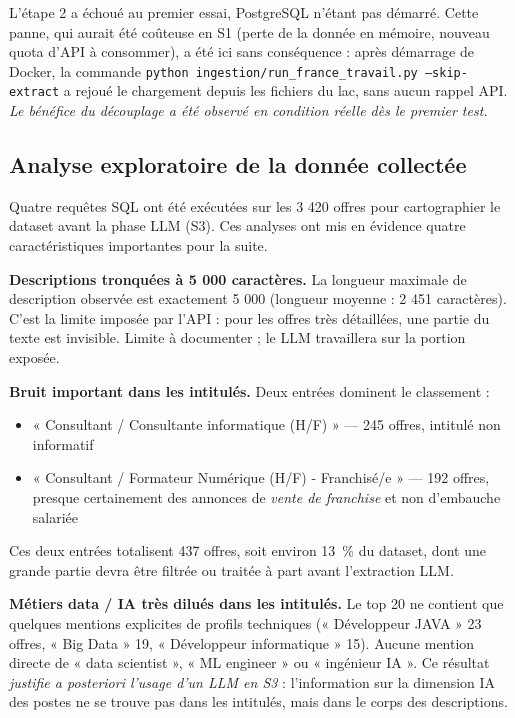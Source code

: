 \documentclass[12pt, a4paper]{article}
\begin{document}
L'étape 2 a échoué au premier essai, PostgreSQL n'étant pas démarré. Cette panne, qui aurait été coûteuse en S1 (perte de la donnée en mémoire, nouveau quota d'API à consommer), a été ici sans conséquence : après démarrage de Docker, la commande \texttt{python ingestion/run\_france\_travail.py --skip-extract} a rejoué le chargement depuis les fichiers du lac, sans aucun rappel API. \emph{Le bénéfice du découplage a été observé en condition réelle dès le premier test.}

\subsection{Analyse exploratoire de la donnée collectée}

Quatre requêtes SQL ont été exécutées sur les 3 420 offres pour cartographier le dataset avant la phase LLM (S3). Ces analyses ont mis en évidence quatre caractéristiques importantes pour la suite.

\textbf{Descriptions tronquées à 5 000 caractères.} La longueur maximale de description observée est exactement 5 000 (longueur moyenne : 2 451 caractères). C'est la limite imposée par l'API : pour les offres très détaillées, une partie du texte est invisible. Limite à documenter ; le LLM travaillera sur la portion exposée.

\textbf{Bruit important dans les intitulés.} Deux entrées dominent le classement :

\begin{itemize}
    \item « Consultant / Consultante informatique (H/F) » --- 245 offres, intitulé non informatif
    \item « Consultant / Formateur Numérique (H/F) - Franchisé/e » --- 192 offres, presque certainement des annonces de \emph{vente de franchise} et non d'embauche salariée
\end{itemize}

Ces deux entrées totalisent 437 offres, soit environ 13~\% du dataset, dont une grande partie devra être filtrée ou traitée à part avant l'extraction LLM.

\textbf{Métiers data / IA très dilués dans les intitulés.} Le top 20 ne contient que quelques mentions explicites de profils techniques (« Développeur JAVA » 23 offres, « Big Data » 19, « Développeur informatique » 15). Aucune mention directe de « data scientist », « ML engineer » ou « ingénieur IA ». Ce résultat \emph{justifie a posteriori l'usage d'un LLM en S3} : l'information sur la dimension IA des postes ne se trouve pas dans les intitulés, mais dans le corps des descriptions.
\end{document}
